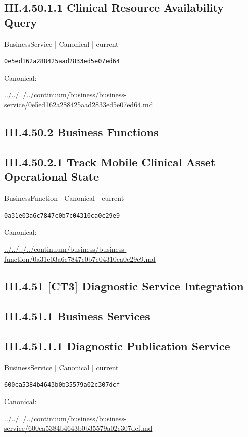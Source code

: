\documentclass[10pt,a4paper]{article}
\begin{document}
\subsection*{III.4.50.1.1 Clinical Resource Availability Query}
{\small BusinessService | Canonical | current}\par
\texttt{0e5ed162a288425aad2833ed5e07ed64}\par
Canonical: \par
{\footnotesize\url{../../../../continuum/business/business-service/0e5ed162a288425aad2833ed5e07ed64.md}}\par
\subsection*{III.4.50.2 Business Functions}
\subsection*{III.4.50.2.1 Track Mobile Clinical Asset Operational State}
{\small BusinessFunction | Canonical | current}\par
\texttt{0a31e03a6c7847c0b7c04310ca0c29e9}\par
Canonical: \par
{\footnotesize\url{../../../../continuum/business/business-function/0a31e03a6c7847c0b7c04310ca0c29e9.md}}\par
\subsection*{III.4.51 [CT3] Diagnostic Service Integration}
\subsection*{III.4.51.1 Business Services}
\subsection*{III.4.51.1.1 Diagnostic Publication Service}
{\small BusinessService | Canonical | current}\par
\texttt{600ca5384b4643b0b35579a02c307dcf}\par
Canonical: \par
{\footnotesize\url{../../../../continuum/business/business-service/600ca5384b4643b0b35579a02c307dcf.md}}\par
\end{document}
